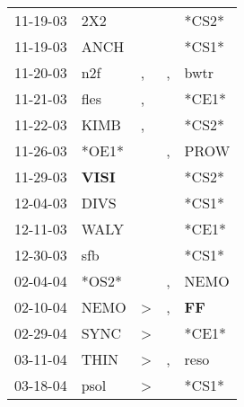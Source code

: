 \begin{supertabular}{p{0.07\textwidth}p{0.06\textwidth}p{0.02\textwidth}p{0.02\textwidth}p{0.06\textwidth}}
 11-19-03\textsuperscript{} &            2X2\textsuperscript{} &               &               &                            *CS2* \\
 11-19-03\textsuperscript{} &           ANCH\textsuperscript{} &               &               &                            *CS1* \\
 11-20-03\textsuperscript{} &            n2f\textsuperscript{} &             , &             , &           bwtr\textsuperscript{} \\
 11-21-03\textsuperscript{} &           fles\textsuperscript{} &             , &               &                            *CE1* \\
 11-22-03\textsuperscript{} &           KIMB\textsuperscript{} &             , &               &                            *CS2* \\
 11-26-03\textsuperscript{} &                            *OE1* &               &             , &           PROW\textsuperscript{} \\
 11-29-03\textsuperscript{} &  \textbf{VISI\textsuperscript{}} &               &               &                            *CS2* \\
 12-04-03\textsuperscript{} &           DIVS\textsuperscript{} &               &               &                            *CS1* \\
 12-11-03\textsuperscript{} &           WALY\textsuperscript{} &               &               &                            *CE1* \\
 12-30-03\textsuperscript{} &            sfb\textsuperscript{} &               &               &                            *CS1* \\
 02-04-04\textsuperscript{} &                            *OS2* &               &             , &           NEMO\textsuperscript{} \\
 02-10-04\textsuperscript{} &           NEMO\textsuperscript{} &  \textgreater &             , &    \textbf{FF\textsuperscript{}} \\
 02-29-04\textsuperscript{} &           SYNC\textsuperscript{} &  \textgreater &               &                            *CE1* \\
 03-11-04\textsuperscript{} &           THIN\textsuperscript{} &  \textgreater &             , &           reso\textsuperscript{} \\
 03-18-04\textsuperscript{} &           psol\textsuperscript{} &  \textgreater &               &                            *CS1* \\

\end{supertabular}
